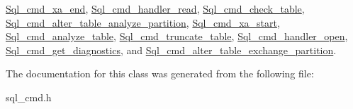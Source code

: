 \mbox{\hyperlink{classSql__cmd__xa__end_a82de55b8107137497f77ce51a9d16fad}{Sql\+\_\+cmd\+\_\+xa\+\_\+end}}, \mbox{\hyperlink{classSql__cmd__handler__read_ab22e7bb754b8f8a9b6d64af65329ca2c}{Sql\+\_\+cmd\+\_\+handler\+\_\+read}}, \mbox{\hyperlink{classSql__cmd__check__table_a05c38a51158692165f18f7c16199c468}{Sql\+\_\+cmd\+\_\+check\+\_\+table}}, \mbox{\hyperlink{classSql__cmd__alter__table__analyze__partition_a71c5e17563536e65e9a048a1205b4fbd}{Sql\+\_\+cmd\+\_\+alter\+\_\+table\+\_\+analyze\+\_\+partition}}, \mbox{\hyperlink{classSql__cmd__xa__start_a1aec90983e7360a72906ac004b792d4f}{Sql\+\_\+cmd\+\_\+xa\+\_\+start}}, \mbox{\hyperlink{classSql__cmd__analyze__table_ab6efba3102a2c21c273245fcd3de28e5}{Sql\+\_\+cmd\+\_\+analyze\+\_\+table}}, \mbox{\hyperlink{classSql__cmd__truncate__table_ab47847ea764e186a542fb8fc834cdad2}{Sql\+\_\+cmd\+\_\+truncate\+\_\+table}}, \mbox{\hyperlink{classSql__cmd__handler__open_a79b3b42813bdf3d60fd796e149674d55}{Sql\+\_\+cmd\+\_\+handler\+\_\+open}}, \mbox{\hyperlink{classSql__cmd__get__diagnostics_aecafd1b2d00aace5a5b238b764aadbab}{Sql\+\_\+cmd\+\_\+get\+\_\+diagnostics}}, and \mbox{\hyperlink{classSql__cmd__alter__table__exchange__partition_a4fe65ee03e6db3c42a6c6db1475bbf09}{Sql\+\_\+cmd\+\_\+alter\+\_\+table\+\_\+exchange\+\_\+partition}}.



The documentation for this class was generated from the following file\+:\begin{DoxyCompactItemize}
\item 
sql\+\_\+cmd.\+h\end{DoxyCompactItemize}
